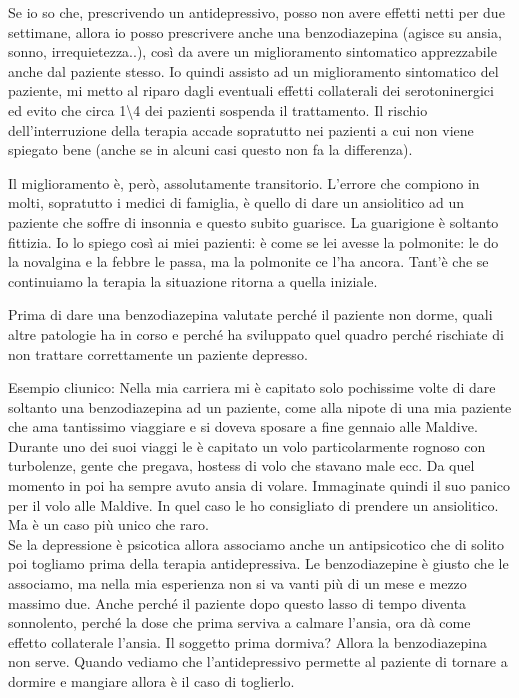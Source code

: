 \documentclass[]{article}
\begin{document}
Se io so che, prescrivendo un antidepressivo, posso non avere effetti
netti per due settimane, allora io posso prescrivere anche una
benzodiazepina (agisce su ansia, sonno, irrequietezza..), così da avere
un miglioramento sintomatico apprezzabile anche dal paziente stesso. Io
quindi assisto ad un miglioramento sintomatico del paziente, mi metto al
riparo dagli eventuali effetti collaterali dei serotoninergici ed evito
che circa 1\textbackslash{}4 dei pazienti sospenda il trattamento. Il
rischio dell'interruzione della terapia accade sopratutto nei pazienti a
cui non viene spiegato bene (anche se in alcuni casi questo non fa la
differenza).

Il miglioramento è, però, assolutamente transitorio. L'errore che
compiono in molti, sopratutto i medici di famiglia, è quello di dare un
ansiolitico ad un paziente che soffre di insonnia e questo subito
guarisce. La guarigione è soltanto fittizia. Io lo spiego così ai miei
pazienti: è come se lei avesse la polmonite: le do la novalgina e la
febbre le passa, ma la polmonite ce l'ha ancora. Tant'è che se
continuiamo la terapia la situazione ritorna a quella iniziale.

Prima di dare una benzodiazepina valutate perché il paziente non dorme,
quali altre patologie ha in corso e perché ha sviluppato quel quadro
perché rischiate di non trattare correttamente un paziente depresso.

Esempio cliunico: Nella mia carriera mi è capitato solo pochissime volte
di dare soltanto una benzodiazepina ad un paziente, come alla nipote di
una mia paziente che ama tantissimo viaggiare e si doveva sposare a fine
gennaio alle Maldive. Durante uno dei suoi viaggi le è capitato un volo
particolarmente rognoso con turbolenze, gente che pregava, hostess di
volo che stavano male ecc. Da quel momento in poi ha sempre avuto ansia
di volare. Immaginate quindi il suo panico per il volo alle Maldive. In
quel caso le ho consigliato di prendere un ansiolitico. Ma è un caso più
unico che raro.\\
Se la depressione è psicotica allora associamo anche un antipsicotico
che di solito poi togliamo prima della terapia antidepressiva. Le
benzodiazepine è giusto che le associamo, ma nella mia esperienza non si
va vanti più di un mese e mezzo massimo due. Anche perché il paziente
dopo questo lasso di tempo diventa sonnolento, perché la dose che prima
serviva a calmare l'ansia, ora dà come effetto collaterale l'ansia. Il
soggetto prima dormiva? Allora la benzodiazepina non serve. Quando
vediamo che l'antidepressivo permette al paziente di tornare a dormire e
mangiare allora è il caso di toglierlo.
\end{document}
